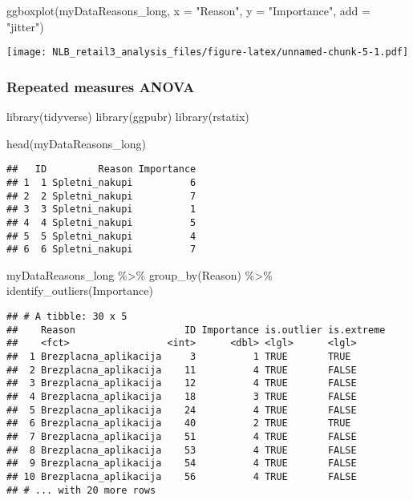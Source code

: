 \documentclass[
]{article}
\newenvironment{Shaded}{\begin{snugshade}}{\end{snugshade}}
\newcommand{\AttributeTok}[1]{\textcolor[rgb]{0.77,0.63,0.00}{#1}}
\newcommand{\FunctionTok}[1]{\textcolor[rgb]{0.00,0.00,0.00}{#1}}
\newcommand{\NormalTok}[1]{#1}
\newcommand{\SpecialCharTok}[1]{\textcolor[rgb]{0.00,0.00,0.00}{#1}}
\newcommand{\StringTok}[1]{\textcolor[rgb]{0.31,0.60,0.02}{#1}}
\begin{document}
\begin{Shaded}
\begin{Highlighting}[]
\FunctionTok{ggboxplot}\NormalTok{(myDataReasons\_long, }
          \AttributeTok{x =} \StringTok{"Reason"}\NormalTok{, }
          \AttributeTok{y =} \StringTok{"Importance"}\NormalTok{, }
          \AttributeTok{add =} \StringTok{"jitter"}\NormalTok{)}
\end{Highlighting}
\end{Shaded}

\texttt{[image: NLB\_retail3\_analysis\_files/figure-latex/unnamed-chunk-5-1.pdf]}

\hypertarget{repeated-measures-anova}{%
\subsubsection{Repeated measures ANOVA}\label{repeated-measures-anova}}

\begin{Shaded}
\begin{Highlighting}[]
\FunctionTok{library}\NormalTok{(tidyverse)}
\FunctionTok{library}\NormalTok{(ggpubr)}
\FunctionTok{library}\NormalTok{(rstatix)}

\FunctionTok{head}\NormalTok{(myDataReasons\_long)}
\end{Highlighting}
\end{Shaded}

\begin{verbatim}
##   ID         Reason Importance
## 1  1 Spletni_nakupi          6
## 2  2 Spletni_nakupi          7
## 3  3 Spletni_nakupi          1
## 4  4 Spletni_nakupi          5
## 5  5 Spletni_nakupi          4
## 6  6 Spletni_nakupi          7
\end{verbatim}

\begin{Shaded}
\begin{Highlighting}[]
\NormalTok{myDataReasons\_long }\SpecialCharTok{\%\textgreater{}\%}
  \FunctionTok{group\_by}\NormalTok{(Reason) }\SpecialCharTok{\%\textgreater{}\%}
  \FunctionTok{identify\_outliers}\NormalTok{(Importance)}
\end{Highlighting}
\end{Shaded}

\begin{verbatim}
## # A tibble: 30 x 5
##    Reason                   ID Importance is.outlier is.extreme
##    <fct>                 <int>      <dbl> <lgl>      <lgl>     
##  1 Brezplacna_aplikacija     3          1 TRUE       TRUE      
##  2 Brezplacna_aplikacija    11          4 TRUE       FALSE     
##  3 Brezplacna_aplikacija    12          4 TRUE       FALSE     
##  4 Brezplacna_aplikacija    18          3 TRUE       FALSE     
##  5 Brezplacna_aplikacija    24          4 TRUE       FALSE     
##  6 Brezplacna_aplikacija    40          2 TRUE       TRUE      
##  7 Brezplacna_aplikacija    51          4 TRUE       FALSE     
##  8 Brezplacna_aplikacija    53          4 TRUE       FALSE     
##  9 Brezplacna_aplikacija    54          4 TRUE       FALSE     
## 10 Brezplacna_aplikacija    56          4 TRUE       FALSE     
## # ... with 20 more rows
\end{verbatim}
\end{document}
